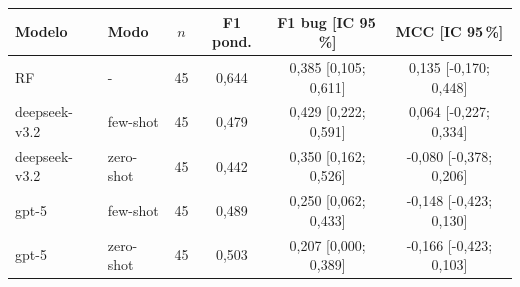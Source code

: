\begin{tabular}{llcccc}
\toprule
Modelo & Modo & $n$ & F1 pond. & F1 bug [IC 95\,\%] & MCC [IC 95\,\%] \\
\midrule
RF & - & 45 & 0,644 & 0,385 [0,105; 0,611] & 0,135 [-0,170; 0,448] \\
deepseek-v3.2 & few-shot & 45 & 0,479 & 0,429 [0,222; 0,591] & 0,064 [-0,227; 0,334] \\
deepseek-v3.2 & zero-shot & 45 & 0,442 & 0,350 [0,162; 0,526] & -0,080 [-0,378; 0,206] \\
gpt-5 & few-shot & 45 & 0,489 & 0,250 [0,062; 0,433] & -0,148 [-0,423; 0,130] \\
gpt-5 & zero-shot & 45 & 0,503 & 0,207 [0,000; 0,389] & -0,166 [-0,423; 0,103] \\
\bottomrule
\end{tabular}
